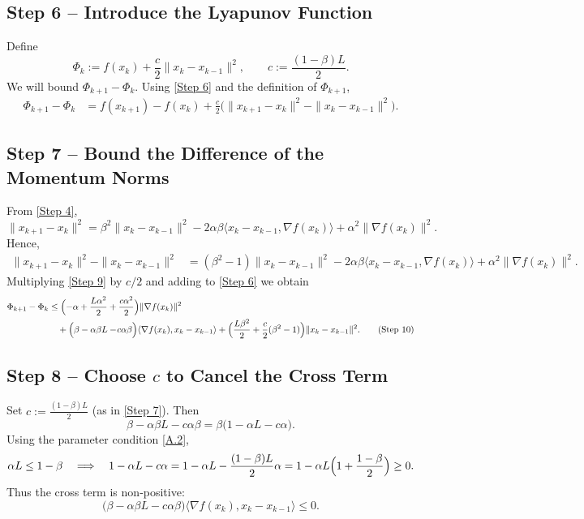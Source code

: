 \documentclass{article}
\begin{document}
\subsection*{Step 6 – Introduce the Lyapunov Function}
Define
\[
\Phi_k:= f(x_k)+\frac{c}{2}\|x_k-x_{k-1}\|^{2},
\qquad c:=\frac{(1-\beta)L}{2}. \tag{Step 7}
\]
We will bound $\Phi_{k+1}-\Phi_k$. Using \eqref{Step 6} and the definition
of $\Phi_{k+1}$,
\begin{align}
\Phi_{k+1}-\Phi_k
&= f(x_{k+1})-f(x_k)
   +\frac{c}{2}\bigl(\|x_{k+1}-x_k\|^{2}
                    -\|x_k-x_{k-1}\|^{2}\bigr). \tag{Step 8}
\end{align}

\subsection*{Step 7 – Bound the Difference of the Momentum Norms}
From \eqref{Step 4},
\[
\|x_{k+1}-x_k\|^{2}
= \beta^{2}\|x_k-x_{k-1}\|^{2}
  -2\alpha\beta\langle x_k-x_{k-1},\nabla f(x_k)\rangle
  +\alpha^{2}\|\nabla f(x_k)\|^{2}.
\]
Hence,
\begin{align}
\|x_{k+1}-x_k\|^{2}
-\|x_k-x_{k-1}\|^{2}
&= (\beta^{2}-1)\|x_k-x_{k-1}\|^{2}
   -2\alpha\beta\langle x_k-x_{k-1},\nabla f(x_k)\rangle
   +\alpha^{2}\|\nabla f(x_k)\|^{2}. \tag{Step 9}
\end{align}
Multiplying \eqref{Step 9} by $c/2$ and adding to \eqref{Step 6} we obtain
\begin{align}
\Phi_{k+1}-\Phi_k
&\le
\Bigl(-\alpha+\frac{L\alpha^{2}}{2}+\frac{c\alpha^{2}}{2}\Bigr)\|\nabla f(x_k)\|^{2} \nonumber\\
&\quad
+\Bigl(\beta-\alpha\beta L-\!c\alpha\beta\Bigr)\langle\nabla f(x_k),x_k-x_{k-1}\rangle
   +\Bigl(\frac{L\beta^{2}}{2}+\frac{c}{2}(\beta^{2}-1)\Bigr)\|x_k-x_{k-1}\|^{2}. \tag{Step 10}
\end{align}

\subsection*{Step 8 – Choose $c$ to Cancel the Cross Term}
Set $c:=\frac{(1-\beta)L}{2}$ (as in \eqref{Step 7}). Then
\[
\beta-\alpha\beta L-c\alpha\beta
= \beta\bigl(1-\alpha L-c\alpha\bigr).
\]
Using the parameter condition \eqref{A.2},
\[
\alpha L\le 1-\beta\quad\Longrightarrow\quad
1-\alpha L-c\alpha = 1-\alpha L-\frac{(1-\beta)L}{2}\alpha
                 = 1-\alpha L\Bigl(1+\frac{1-\beta}{2}\Bigr)\ge 0.
\]
Thus the cross term is non‑positive:
\[
\bigl(\beta-\alpha\beta L-c\alpha\beta\bigr)\langle\nabla f(x_k),x_k-x_{k-1}\rangle
\le 0. \tag{Step 11}
\]
\end{document}
